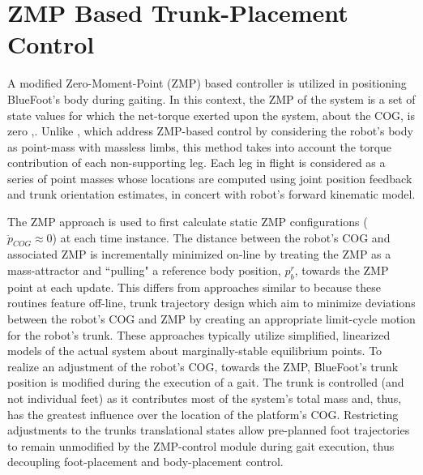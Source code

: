 	\section{ZMP Based Trunk-Placement Control}

		A  modified Zero-Moment-Point (ZMP) based controller is utilized in positioning BlueFoot's body during gaiting. In this context, the ZMP of the system is a set of state values for which the net-torque exerted upon the system, about the COG, is zero \cite{Kajita2003},\cite{Katie2009}. Unlike \cite{Takanishi1989,Kurazume2003}, which address ZMP-based control by considering the robot's body as point-mass with massless limbs, this method takes into account the torque contribution of each non-supporting leg. Each leg in flight is considered as a series of point masses whose locations are computed using joint position feedback and trunk orientation estimates, in concert with robot's forward kinematic model.
		
		The ZMP approach is used to first calculate static ZMP configurations ( \IE $\ddot{p}_{COG}\approx0$) at each time instance. The distance between the robot's COG and associated ZMP is incrementally minimized on-line by treating the ZMP as a  mass-attractor and ``pulling" a reference body position, ${p}_{b}^{r}$, towards the ZMP point at each update. This differs from approaches similar to \cite{Kurazume2003} because these routines feature off-line, trunk trajectory design which aim to minimize deviations between the robot's COG and ZMP by creating an appropriate limit-cycle motion for the robot's trunk. These approaches typically utilize simplified, linearized models of the actual system about marginally-stable equilibrium points. To realize an adjustment of the robot's COG, towards the ZMP, BlueFoot's trunk position is modified during the execution of a gait. The trunk is controlled (and not individual feet) as it contributes most of the system's total mass and, thus, has the greatest influence over the location of the platform's COG. Restricting adjustments to the trunks translational states allow pre-planned foot trajectories to remain unmodified by the ZMP-control module during gait execution, thus decoupling foot-placement and body-placement control.

